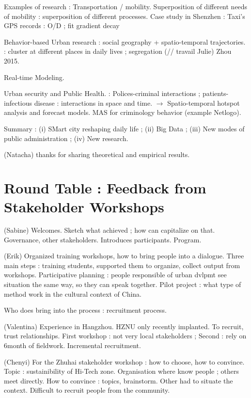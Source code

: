 Examples of research : Transportation / mobility. Superposition of different needs of mobility : superposition of different processes. Case study in Shenzhen : Taxi's GPS records : O/D ; fit gradient decay

Behavior-based Urban research : social geography + spatio-temporal trajectories. : cluster at different places in daily lives ; segregation (// travail Julie) Zhou 2015.

Real-time Modeling.

Urban security and Public Health. : Polices-criminal interactions ; patients-infectious disease : interactions in space and time. $\rightarrow$ Spatio-temporal hotspot analysis and forecast models. MAS for criminology behavior (example Netlogo).

Summary : (i) SMart city reshaping daily life ; (ii) Big Data ; (iii) New modes of public administration ; (iv) New research.

(Natacha) thanks for sharing theoretical and empirical results.





\section*{Round Table : Feedback from Stakeholder Workshops}


(Sabine) Welcomes. Sketch what achieved ; how can capitalize on that. Governance, other stakeholders. Introduces participants. Program.

(Erik) Organized training workshops, how to bring people into a dialogue. Three main steps : training students, supported them to organize, collect output from workshops. Participative planning : people responsible of urban dvlpmt see situation the same way, so they can speak together. Pilot project : what type of method work in the cultural context of China.

Who does bring into the process : recruitment process.

(Valentina) Experience in Hangzhou. HZNU only recently implanted. To recruit, trust relationships. First workshop : not very local stakeholders ; Second : rely on 6month of fieldwork. Incremental recruitment. 

(Chenyi) For the Zhuhai stakeholder workshop : how to choose, how to convince. Topic : sustainibility of Hi-Tech zone. Organisation where know people ; others meet directly. How to convince : topics, brainstorm. Other had to situate the context. Difficult to recruit people from the community. 

